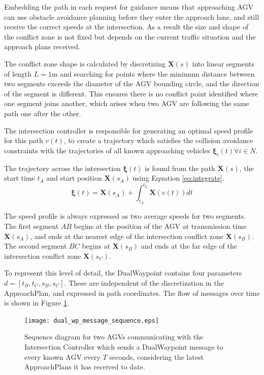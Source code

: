 Embedding the path in each request for guidance means that approaching AGV can use obstacle avoidance planning before they enter the approach lane, and still receive the correct speeds at the intersection. As a result the size and shape of the conflict zone is not fixed but depends on the current traffic situation and the approach plans received.

The conflict zone shape is calculated by discretizing $\bm{X}(s)$ into linear segments of length $L=1$m and searching for points where the minimum distance between two segments exceeds the diameter of the AGV bounding circle, and the direction of the segment is different. This ensures there is no conflict point identified where one segment joins another, which arises when two AGV are following the same path one after the other.  

The intersection controller is responsible for generating an optimal speed profile for this path $v(t)$, to create a trajectory which satisfies the collision avoidance constraints with the trajectories of all known approaching vehicles $\bm{\xi}_i(t) \forall i \in N$. 

The trajectory across the intersection $\bm{\xi}(t)$ is found from the path $\bm{X}(s)$, the start time $t_A$ and start position $\bm{X}(s_A)$ using Equation \ref{eq:integrate}.
\begin{equation}
\bm{\xi}(t)  = \bm{X}(s_A) + \int_{t_A}^{t_L} \bm{X}\left( v(t) \right)  dt
\label{eq:integrate}
\end{equation}

The speed profile is always expressed as two average speeds for two segments. The first segment $AB$ begins at the position of the AGV at transmission time $\bm{X}(s_A)$, and ends at the nearest edge of the intersection conflict zone $\bm{X}(s_B)$. The second segment $BC$ begins at $\bm{X}(s_B)$ and ends at the far edge of the intersection conflict zone $\bm{X}(s_C)$.  

To represent this level of detail, the DualWaypoint contains four parameters $d =[t_B, t_C, s_B, s_C]$. These are independent of the discretization in the ApproachPlan, and expressed in path coordinates. The flow of messages over time is shown in Figure \ref{fig:dual_wp_message_sequence}.

\begin{figure}[ht]
	\centering
	\texttt{[image: dual\_wp\_message\_sequence.eps]}
	\caption{Sequence diagram for two AGVs communicating with the Intersection Controller which sends a DualWaypoint message to every known AGV every $T$ seconds, considering the latest ApproachPlans it has received to date. }
	\label{fig:dual_wp_message_sequence}
\end{figure}


